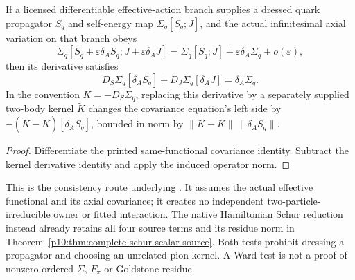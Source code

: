\documentclass[12pt,a4paper]{article}
\begin{document}
\begin{corollary}
\label{p10:cor:v2210-lit-axial-functional-test}
If a licensed differentiable effective-action branch supplies a dressed
quark propagator $S_q$ and self-energy map $\Sigma_q[S_q;J]$, and the actual
infinitesimal axial variation on that branch obeys
\[
 \Sigma_q[S_q+\varepsilon\delta_A S_q;J+\varepsilon\delta_AJ]
 =\Sigma_q[S_q;J]+\varepsilon\delta_A\Sigma_q+o(\varepsilon),
\]
then its derivative satisfies
\[
 D_S\Sigma_q[\delta_A S_q]+D_J\Sigma_q[\delta_AJ]
 =\delta_A\Sigma_q.
\]
In the convention $K=-D_S\Sigma_q$, replacing this derivative by a separately
supplied two-body kernel $\widetilde K$ changes the covariance equation's
left side by $-(\widetilde K-K)[\delta_A S_q]$, bounded in norm by
$\|\widetilde K-K\|\,\|\delta_A S_q\|$.
\end{corollary}
\begin{proof}
Differentiate the printed same-functional covariance identity. Subtract the
kernel derivative identity and apply the induced operator norm.
\end{proof}
This is the consistency route underlying
\cite{LitQCDMunczek1995Axial,LitQCDMarisRobertsTandy1998Pion}.
It assumes the actual effective functional and its axial covariance; it
creates no independent two-particle-irreducible owner or fitted interaction.
The native Hamiltonian Schur reduction instead already retains all four
source terms and its residue norm in
Theorem~\ref{p10:thm:complete-schur-scalar-source}. Both tests prohibit
dressing a propagator and choosing an unrelated pion kernel. A Ward test is
not a proof of nonzero ordered $\Sigma$, $F_\pi$ or Goldstone residue.


\end{document}
